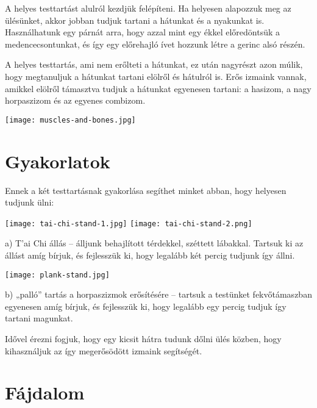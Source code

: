 \documentclass[10pt,oneside,landscape,final]{memoir}
\begin{document}
A helyes testtartást alulról kezdjük felépíteni. Ha helyesen alapozzuk meg az
ülésünket, akkor jobban tudjuk tartani a hátunkat és a nyakunkat is.
Használhatunk egy párnát arra, hogy azzal mint egy ékkel előredöntsük a
medencecsontunkat, és így egy előrehajló ívet hozzunk létre a gerinc alsó
részén.

A helyes testtartás, ami nem erőlteti a hátunkat, ez után nagyrészt azon múlik,
hogy megtanuljuk a hátunkat tartani elölről és hátulról is. Erős izmaink vannak,
amikkel elölről támasztva tudjuk a hátunkat egyenesen tartani: a hasizom, a nagy
horpaszizom és az egyenes combizom.

{\centering\par
\texttt{[image: muscles-and-bones.jpg]}
\par}

\clearpage

\section{Gyakorlatok}

Ennek a két testtartásnak gyakorlása segíthet minket abban, hogy helyesen
tudjunk ülni:

{\centering\par
\texttt{[image: tai-chi-stand-1.jpg]}%
\hspace*{5mm}%
\texttt{[image: tai-chi-stand-2.png]}
\par}

a) T’ai Chi állás – álljunk behajlított térdekkel, széttett lábakkal. Tartsuk ki
az állást amíg bírjuk, és fejlesszük ki, hogy legalább két percig tudjunk így
állni.

{\centering\par
\texttt{[image: plank-stand.jpg]}%
\par}

b) „palló” tartás a horpaszizmok erősítésére – tartsuk a testünket
fekvőtámaszban egyenesen amíg bírjuk, és fejlesszük ki, hogy legalább egy percig
tudjuk így tartani magunkat.

Idővel érezni fogjuk, hogy egy kicsit hátra tudunk dőlni ülés közben, hogy
kihasználjuk az így megerősödött izmaink segítségét.

\section{Fájdalom}
\end{document}
